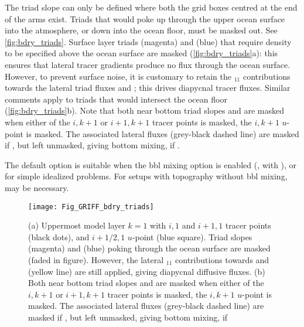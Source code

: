 \documentclass[../main/NEMO_manual]{subfiles}
\begin{document}
The triad slope can only be defined where both the grid boxes centred at the end of the arms exist.
Triads that would poke up through the upper ocean surface into the atmosphere,
or down into the ocean floor, must be masked out.
See \autoref{fig:bdry_triads}.
Surface layer triads  (magenta) and  (blue) that
require density to be specified above the ocean surface are masked (\autoref{fig:bdry_triads}a):
this ensures that lateral tracer gradients produce no flux through the ocean surface.
However, to prevent surface noise, it is customary to retain the $_{11}$ contributions towards
the lateral triad fluxes  and ;
this drives diapycnal tracer fluxes.
Similar comments apply to triads that would intersect the ocean floor (\autoref{fig:bdry_triads}b).
Note that both near bottom triad slopes  and  are masked when
either of the $i,k+1$ or $i+1,k+1$ tracer points is masked, \ie the $i,k+1$ $u$-point is masked.
The associated lateral fluxes (grey-black dashed line) are masked if ,
but left unmasked, giving bottom mixing, if .

The default option  is suitable when the bbl mixing option is enabled
(, with ), or for simple idealized problems.
For setups with topography without bbl mixing,  may be necessary.
\begin{figure}[h]
  \begin{center}
    \texttt{[image: Fig\_GRIFF\_bdry\_triads]}
    \caption{
      \protect\label{fig:bdry_triads}
      (a) Uppermost model layer $k=1$ with $i,1$ and $i+1,1$ tracer points (black dots),
      and $i+1/2,1$ $u$-point (blue square).
      Triad slopes  (magenta) and  (blue) poking through
      the ocean surface are masked (faded in figure).
      However, the lateral $_{11}$ contributions towards  and
       (yellow line) are still applied,
      giving diapycnal diffusive fluxes.
      \newline
      (b) Both near bottom triad slopes  and
       are masked when either of the $i,k+1$ or $i+1,k+1$ tracer points is masked,
      \ie the $i,k+1$ $u$-point is masked.
      The associated lateral fluxes (grey-black dashed line) are masked if
      \protect{}, but left unmasked,
      giving bottom mixing, if \protect{}
    }
  \end{center}
\end{figure}
\end{document}

